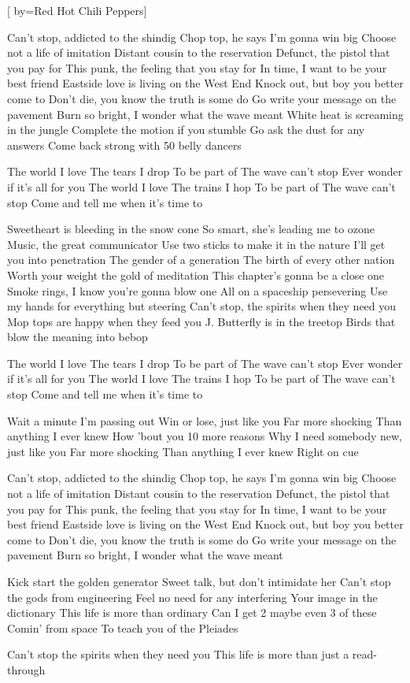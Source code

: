 [
	by={Red Hot Chili Peppers}]

\chordsoff

\beginverse
Can't stop, addicted to the shindig
Chop top, he says I'm gonna win big
Choose not a life of imitation
Distant cousin to the reservation
Defunct, the pistol that you pay for
This punk, the feeling that you stay for
In time, I want to be your best friend
Eastside love is living on the West End
Knock out, but boy you better come to
Don't die, you know the truth is some do
Go write your message on the pavement
Burn so bright, I wonder what the wave meant
White heat is screaming in the jungle
Complete the motion if you stumble
Go ask the dust for any answers
Come back strong with 50 belly dancers
\endverse

\beginchorus
The world I love The tears I drop To be part of The wave can't stop
Ever wonder if it's all for you
The world I love The trains I hop To be part of The wave can't stop
Come and tell me when it's time to
\endchorus

\beginverse
Sweetheart is bleeding in the snow cone
So smart, she's leading me to ozone
Music, the great communicator
Use two sticks to make it in the nature
I'll get you into penetration
The gender of a generation
The birth of every other nation
Worth your weight the gold of meditation
This chapter's gonna be a close one
Smoke rings, I know you're gonna blow one
All on a spaceship persevering
Use my hands for everything but steering
Can't stop, the spirits when they need you
Mop tops are happy when they feed you
J. Butterfly is in the treetop
Birds that blow the meaning into bebop
\endverse

\beginchorus
The world I love The tears I drop To be part of The wave can't stop
Ever wonder if it's all for you
The world I love The trains I hop To be part of The wave can't stop
Come and tell me when it's time to

Wait a minute I'm passing out Win or lose, just like you
Far more shocking Than anything I ever knew How 'bout you
10 more reasons Why I need somebody new, just like you
Far more shocking Than anything I ever knew Right on cue
\endchorus

\beginverse
Can't stop, addicted to the shindig
Chop top, he says I'm gonna win big
Choose not a life of imitation
Distant cousin to the reservation
Defunct, the pistol that you pay for
This punk, the feeling that you stay for
In time, I want to be your best friend
Eastside love is living on the West End
Knock out, but boy you better come to
Don't die, you know the truth is some do
Go write your message on the pavement
Burn so bright, I wonder what the wave meant
\endverse

\beginverse
Kick start the golden generator
Sweet talk, but don't intimidate her
Can't stop the gods from engineering
Feel no need for any interfering
Your image in the dictionary
This life is more than ordinary
Can I get 2 maybe even 3 of these
Comin' from space
To teach you of the Pleiades
\endverse

\beginverse
Can't stop the spirits when they need you
This life is more than just a read-through
\endverse

\endsong
